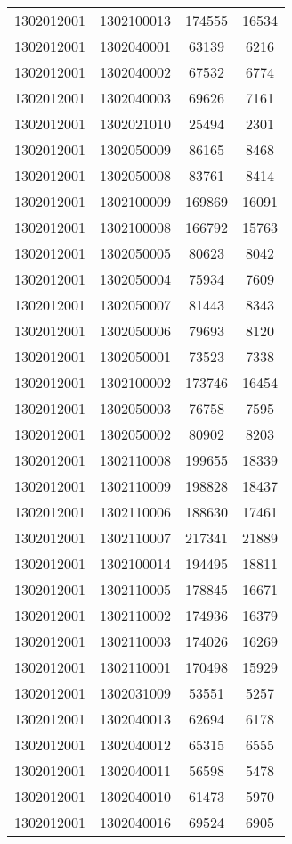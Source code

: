 \begin{longtable}{llcc}
1302012001 & 1302100013 & 174555 & 16534\\
1302012001 & 1302040001 & 63139 & 6216\\
1302012001 & 1302040002 & 67532 & 6774\\
1302012001 & 1302040003 & 69626 & 7161\\
1302012001 & 1302021010 & 25494 & 2301\\
1302012001 & 1302050009 & 86165 & 8468\\
1302012001 & 1302050008 & 83761 & 8414\\
1302012001 & 1302100009 & 169869 & 16091\\
1302012001 & 1302100008 & 166792 & 15763\\
1302012001 & 1302050005 & 80623 & 8042\\
1302012001 & 1302050004 & 75934 & 7609\\
1302012001 & 1302050007 & 81443 & 8343\\
1302012001 & 1302050006 & 79693 & 8120\\
1302012001 & 1302050001 & 73523 & 7338\\
1302012001 & 1302100002 & 173746 & 16454\\
1302012001 & 1302050003 & 76758 & 7595\\
1302012001 & 1302050002 & 80902 & 8203\\
1302012001 & 1302110008 & 199655 & 18339\\
1302012001 & 1302110009 & 198828 & 18437\\
1302012001 & 1302110006 & 188630 & 17461\\
1302012001 & 1302110007 & 217341 & 21889\\
1302012001 & 1302100014 & 194495 & 18811\\
1302012001 & 1302110005 & 178845 & 16671\\
1302012001 & 1302110002 & 174936 & 16379\\
1302012001 & 1302110003 & 174026 & 16269\\
1302012001 & 1302110001 & 170498 & 15929\\
1302012001 & 1302031009 & 53551 & 5257\\
1302012001 & 1302040013 & 62694 & 6178\\
1302012001 & 1302040012 & 65315 & 6555\\
1302012001 & 1302040011 & 56598 & 5478\\
1302012001 & 1302040010 & 61473 & 5970\\
1302012001 & 1302040016 & 69524 & 6905\\

\end{longtable}

